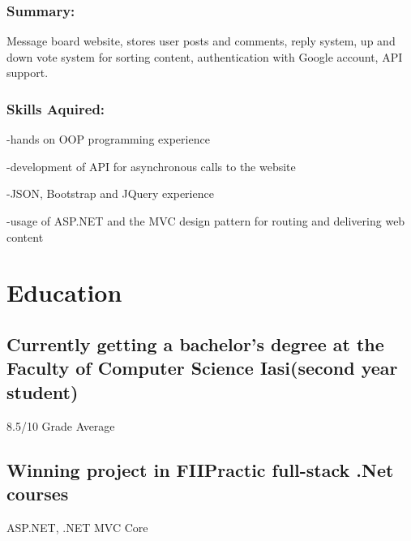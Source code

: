 \documentclass[a4paper,hidelinks,8pt]{article}
\begin{document}
\subsubsection{Summary:}
Message board website, stores user posts and comments, reply system, up and down vote system for sorting content, authentication with Google account, API support.
\subsubsection{Skills Aquired:}
-hands on OOP programming experience

-development of API for asynchronous calls to the website

-JSON, Bootstrap and JQuery experience

-usage of ASP.NET and the MVC design pattern for routing and delivering web content

\section{Education}
\subsection{Currently getting a bachelor's degree at 
the Faculty of Computer Science Iasi(second year student)}
 8.5/10 Grade Average

\subsection{Winning project in FIIPractic full-stack .Net courses}
ASP.NET, .NET MVC Core
\end{document}
